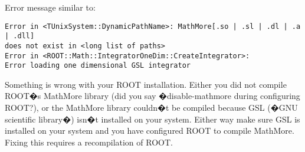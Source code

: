 Error message similar to:
{\scriptsize \begin{verbatim}
Error in <TUnixSystem::DynamicPathName>: MathMore[.so | .sl | .dl | .a | .dll] 
does not exist in <long list of paths>
Error in <ROOT::Math::IntegratorOneDim::CreateIntegrator>: 
Error loading one dimensional GSL integrator
\end{verbatim}
}

Something is wrong with your ROOT installation. Either you did not compile ROOT�s MathMore library (did you say �disable-mathmore during configuring ROOT?), or the MathMore library couldn�t be compiled because GSL (�GNU scientific library�) isn�t installed on your system. Either way make sure GSL is installed on your system and you have configured ROOT to compile MathMore. Fixing this requires a recompilation of ROOT.


